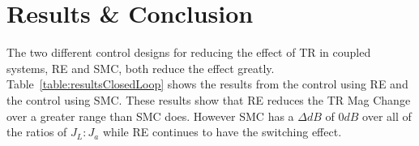  \section{Results \& Conclusion}\label{sec:con}
% 
The two different control designs for reducing the effect of TR in coupled systems, RE and SMC, both
reduce the effect greatly. Table~\ref{table:resultsClosedLoop} shows the results from the control using RE 
and the control using SMC. These results show that RE reduces the TR Mag Change over a
greater range than SMC does. However SMC has a $\Delta dB$ of $0dB$ over all of the ratios of $J_L:J_a$ while RE
continues to have the switching effect.
 
 
 